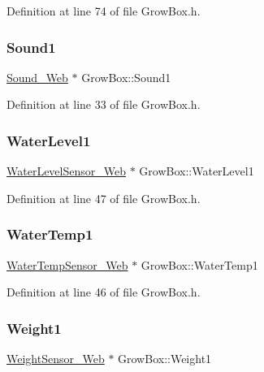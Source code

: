 Definition at line 74 of file Grow\+Box.\+h.

\mbox{\label{class_grow_box_aca5ba68e2366069df908907d02e2420b}} 
\subsubsection{\texorpdfstring{Sound1}{Sound1}}
{\footnotesize\ttfamily \hyperlink{class_sound___web}{Sound\+\_\+\+Web} $\ast$ Grow\+Box\+::\+Sound1}



Definition at line 33 of file Grow\+Box.\+h.

\mbox{\label{class_grow_box_a59c79308af69a11ab4e3875679af73cd}} 
\subsubsection{\texorpdfstring{Water\+Level1}{WaterLevel1}}
{\footnotesize\ttfamily \hyperlink{class_water_level_sensor___web}{Water\+Level\+Sensor\+\_\+\+Web} $\ast$ Grow\+Box\+::\+Water\+Level1}



Definition at line 47 of file Grow\+Box.\+h.

\mbox{\label{class_grow_box_a88f7a7dfabb1fbd40f70bcf0c1bba367}} 
\subsubsection{\texorpdfstring{Water\+Temp1}{WaterTemp1}}
{\footnotesize\ttfamily \hyperlink{class_water_temp_sensor___web}{Water\+Temp\+Sensor\+\_\+\+Web} $\ast$ Grow\+Box\+::\+Water\+Temp1}



Definition at line 46 of file Grow\+Box.\+h.

\mbox{\label{class_grow_box_aceb1416333b51cdde29c05cd9bc4564a}} 
\subsubsection{\texorpdfstring{Weight1}{Weight1}}
{\footnotesize\ttfamily \hyperlink{class_weight_sensor___web}{Weight\+Sensor\+\_\+\+Web} $\ast$ Grow\+Box\+::\+Weight1}




